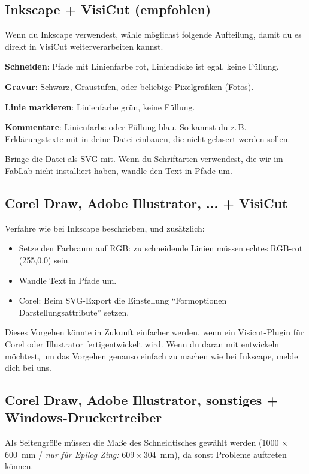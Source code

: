 \documentclass{\basedir/fablab-document}
\newcommand{\nurZing}{\emph{nur für Epilog Zing:} }
\begin{document}
	\subsection{Inkscape + VisiCut (empfohlen)}
	Wenn du Inkscape verwendest, wähle möglichst folgende Aufteilung, damit du es direkt in VisiCut weiterverarbeiten kannst.

	\textbf{Schneiden}: Pfade mit Linienfarbe rot, Liniendicke ist egal, keine Füllung.

	\textbf{Gravur}: Schwarz, Graustufen, oder beliebige Pixelgrafiken (Fotos).

	\textbf{Linie markieren}: Linienfarbe grün, keine Füllung.

	\textbf{Kommentare}: Linienfarbe oder Füllung blau. So kannst du z.\,B. Erklärungstexte mit in deine Datei einbauen, die nicht gelasert werden sollen.

	Bringe die Datei als SVG mit. Wenn du Schriftarten verwendest, die wir im FabLab nicht installiert haben, wandle den Text in Pfade um.


	\subsection{Corel Draw, Adobe Illustrator, ... + VisiCut}
	\label{corel-illustrator-svg-visicut}
	Verfahre wie bei Inkscape beschrieben, und zusätzlich:

	\begin{itemize}
		\item Setze den Farbraum auf RGB: zu schneidende Linien müssen echtes RGB-rot (255,0,0) sein.
		\item Wandle Text in Pfade um.
		\item Corel: Beim SVG-Export die Einstellung \enquote{Formoptionen = Darstellungsattribute} setzen.
	\end{itemize}

	Dieses Vorgehen könnte in Zukunft einfacher werden, wenn ein Visicut-Plugin für Corel oder Illustrator fertigentwickelt wird. Wenn du daran mit entwickeln möchtest, um das Vorgehen genauso einfach zu machen wie bei Inkscape, melde dich bei uns.

	\subsection{Corel Draw, Adobe Illustrator, sonstiges + Windows-Druckertreiber} \label{sec:einstellungen-windowstreiber}
	Als Seitengröße müssen die Maße des Schneidtisches gewählt werden (1000 $\times$ 600~mm / \nurZing 609\,$\times$\,304~mm), da sonst Probleme auftreten können.
\end{document}
